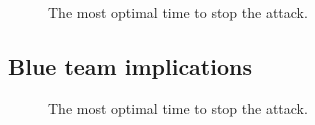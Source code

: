 \begin{figure}[t!]
\centerline{}
\caption{The most optimal time to stop the attack.}
\label{openandclosed}
\end{figure}


\subsection{Blue team implications}

\begin{figure}[t!]
\centerline{}
\caption{The most optimal time to stop the attack.}
\label{openandclosed}
\end{figure}




